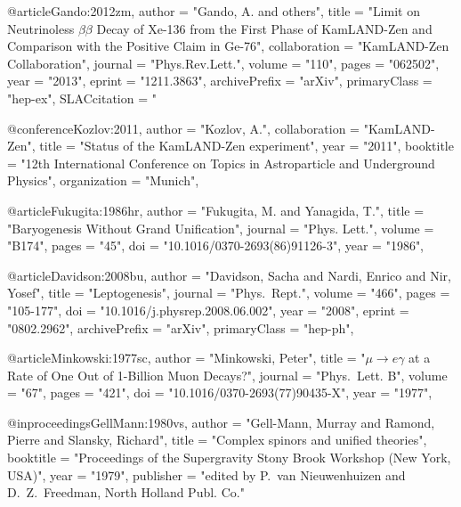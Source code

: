 @article{Gando:2012zm,
      author         = "Gando, A. and others",
      title          = "{Limit on Neutrinoless $\beta\beta$ Decay of Xe-136 from
                        the First Phase of KamLAND-Zen and Comparison with the
                        Positive Claim in Ge-76}",
      collaboration  = "KamLAND-Zen Collaboration",
      journal        = "Phys.Rev.Lett.",
      volume         = "110",
      pages          = "062502",
      year           = "2013",
      eprint         = "1211.3863",
      archivePrefix  = "arXiv",
      primaryClass   = "hep-ex",
      SLACcitation   = "%
}

@conference{Kozlov:2011,
      author         = "Kozlov, A.",
      collaboration  = "KamLAND-Zen",
      title          = "Status of the KamLAND-Zen experiment",
      year           = "2011",
      booktitle      = "{12th International Conference on Topics in Astroparticle 
                        and Underground Physics}",
      organization   = "Munich",
}

@article{Fukugita:1986hr,
      author         = "Fukugita, M. and Yanagida, T.",
      title          = "{Baryogenesis Without Grand Unification}",
      journal        = "Phys. Lett.",
      volume         = "B174",
      pages          = "45",
      doi            = "10.1016/0370-2693(86)91126-3",
      year           = "1986",
}

@article{Davidson:2008bu,
      author         = "Davidson, Sacha and Nardi, Enrico and Nir, Yosef",
      title          = "{Leptogenesis}",
      journal        = "Phys.\ Rept.",
      volume         = "466",
      pages          = "105-177",
      doi            = "10.1016/j.physrep.2008.06.002",
      year           = "2008",
      eprint         = "0802.2962",
      archivePrefix  = "arXiv",
      primaryClass   = "hep-ph",
}

@article{Minkowski:1977sc,
      author         = "Minkowski, Peter",
      title          = "$\mu \rightarrow e \gamma$ at a Rate of One Out of 1-Billion Muon
                        Decays?",
      journal        = "Phys.\ Lett. B",
      volume         = "67",
      pages          = "421",
      doi            = "10.1016/0370-2693(77)90435-X",
      year           = "1977",
}

@inproceedings{GellMann:1980vs,
      author         = "Gell-Mann, Murray and Ramond, Pierre and Slansky,
                        Richard",
      title          = "{Complex spinors and unified theories}",
      booktitle      = "Proceedings of the {Supergravity} Stony Brook Workshop
                        (New York, USA)",
      year           = "1979",
      publisher      = "edited by P.~van Nieuwenhuizen and D.~Z.~Freedman, 
                        North Holland Publ. Co."
}

